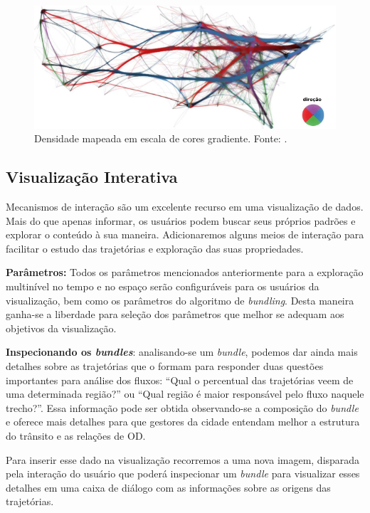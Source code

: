\begin{figure}[ht!]
  \centering
  \includegraphics[width=\textwidth]{../figuras/color-wheel.pdf}
  \caption{Densidade mapeada em escala de cores gradiente. Fonte: \citet{Lhuillier2017}. \label{fig:direction}}
\end{figure}

\subsection{Visualização Interativa}

Mecanismos de interação são um excelente recurso em uma visualização de dados.
Mais do que apenas informar, os usuários podem buscar seus próprios padrões e
explorar o conteúdo à sua maneira. Adicionaremos alguns meios de interação para
facilitar o estudo das trajetórias e exploração das suas propriedades.

\textbf{Parâmetros:} Todos os parâmetros mencionados anteriormente para a exploração
multinível no tempo e no espaço serão configuráveis para os usuários da visualização,
bem como os parâmetros do algoritmo de \emph{bundling}. Desta maneira ganha-se
a liberdade para seleção dos parâmetros que melhor se adequam aos objetivos
da visualização.

\textbf{Inspecionando os \emph{bundles}}: analisando-se um \emph{bundle},
podemos dar ainda mais detalhes sobre as trajetórias que o formam para
responder duas questões importantes para análise dos fluxos: ``Qual o percentual
das trajetórias veem de uma determinada região?'' ou ``Qual região é maior
responsável pelo fluxo naquele trecho?''.  Essa informação pode ser obtida
observando-se a composição do \emph{bundle} e oferece mais detalhes para que
gestores da cidade entendam melhor a estrutura do trânsito e as relações de OD.

 Para inserir esse dado na visualização recorremos a uma nova
imagem, disparada pela interação do usuário que poderá inspecionar um
\emph{bundle} para visualizar esses detalhes em uma caixa de diálogo com as
informações sobre as origens das trajetórias.

